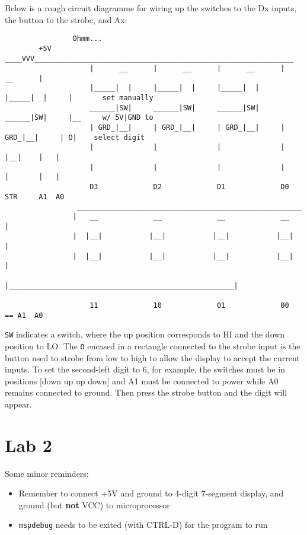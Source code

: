 \documentclass[11pt]{article}
\begin{document}
		Below is a rough circuit diagramme for wiring up the switches to the Dx inputs, the button to the strobe, and Ax:
	\begin{verbatim}
		        Ohmm...
		+5V ____VVV_____________________________________________________________
		            |      __      |      __      |      __      |      __      |
		            |_____|  |     |_____|  |     |_____|  |     |_____|  |     |       set manually
		            ______|SW|     ______|SW|     ______|SW|     ______|SW|     |__     w/ 5V|GND to
		            | GRD_|__|     | GRD_|__|     | GRD_|__|     | GRD_|__|     | O|    select digit
		            |              |              |              |              |__|    |   |
		            |              |              |              |              |       |   |
		            D3             D2             D1             D0             STR     A1  A0
		         _____________________________________________________
		        |   __             __             __             __   |
		        |  |__|           |__|           |__|           |__|  |
		        |  |__|           |__|           |__|           |__|  |
		        |_____________________________________________________|
		
		            11             10             01             00                  == A1  A0
	\end{verbatim}
		\texttt{SW} indicates a switch, where the up position corresponds to HI and the down position to LO. The \texttt{O} encased in a rectangle connected to the strobe input is the button used to strobe from low to high to allow the display to accept the current inputs. To set the second-left digit to 6, for example, the switches must be in positions [down up up down] and A1 must be connected to power while A0 remains connected to ground. Then press the strobe button and the digit will appear.
	
	\newpage
	\section{Lab 2}
		Some minor reminders:
	\begin{itemize}
		\item Remember to connect +5V and ground to 4-digit 7-segment display, and ground (but \textbf{not} VCC) to microprocessor
		\item \texttt{mspdebug} needs to be exited (with CTRL-D) for the program to run
	\end{itemize}
\end{document}
